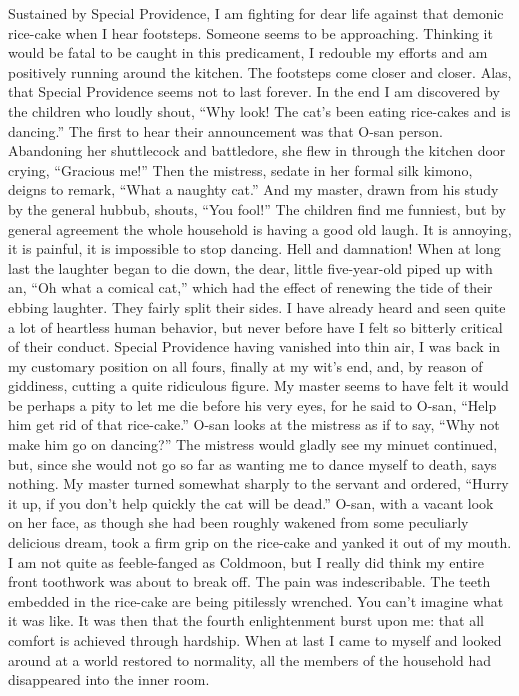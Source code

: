 \documentclass[12pt, openright]{book}
\begin{document}
Sustained by Special Providence, I am fighting for dear life against
that demonic rice-cake when I hear footsteps. Someone seems to be
approaching. Thinking it would be fatal to be caught in this
predicament, I redouble my efforts and am positively running around the
kitchen. The footsteps come closer and closer. Alas, that Special
Providence seems not to last forever. In the end I am discovered by the
children who loudly shout, ``Why look! The cat's been eating rice-cakes
and is dancing.'' The first to hear their announcement was that O-san
person. Abandoning her shuttlecock and battledore, she flew in through
the kitchen door crying, ``Gracious me!'' Then the mistress, sedate in
her formal silk kimono, deigns to remark, ``What a naughty cat.'' And my
master, drawn from his study by the general hubbub, shouts, ``You
fool!'' The children find me funniest, but by general agreement the
whole household is having a good old laugh. It is annoying, it is
painful, it is impossible to stop dancing. Hell and damnation! When at
long last the laughter began to die down, the dear, little five-year-old
piped up with an, ``Oh what a comical cat,'' which had the effect of
renewing the tide of their ebbing laughter. They fairly split their
sides. I have already heard and seen quite a lot of heartless human
behavior, but never before have I felt so bitterly critical of their
conduct. Special Providence having vanished into thin air, I was back in
my customary position on all fours, finally at my wit's end, and, by
reason of giddiness, cutting a quite ridiculous figure. My master seems
to have felt it would be perhaps a pity to let me die before his very
eyes, for he said to O-san, ``Help him get rid of that rice-cake.''
O-san looks at the mistress as if to say, ``Why not make him go on
dancing?'' The mistress would gladly see my minuet continued, but, since
she would not go so far as wanting me to dance myself to death, says
nothing. My master turned somewhat sharply to the servant and ordered,
``Hurry it up, if you don't help quickly the cat will be dead.'' O-san,
with a vacant look on her face, as though she had been roughly wakened
from some peculiarly delicious dream, took a firm grip on the rice-cake
and yanked it out of my mouth. I am not quite as feeble-fanged as
Coldmoon, but I really did think my entire front toothwork was about to
break off. The pain was indescribable. The teeth embedded in the
rice-cake are being pitilessly wrenched. You can't imagine what it was
like. It was then that the fourth enlightenment burst upon me: that all
comfort is achieved through hardship. When at last I came to myself and
looked around at a world restored to normality, all the members of the
household had disappeared into the inner room.
\end{document}
